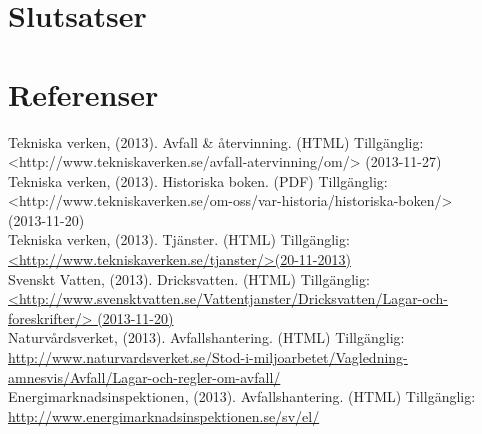 \documentclass[10pt,a4paper]{article}
\begin{document}
\section{Slutsatser}

\newpage
\section{Referenser}
Tekniska verken, (2013). Avfall \& återvinning. (HTML) Tillgänglig: \\
<http://www.tekniskaverken.se/avfall-atervinning/om/> (2013-11-27) \\
\newline
Tekniska verken, (2013). Historiska boken. (PDF) Tillgänglig: \\
<http://www.tekniskaverken.se/om-oss/var-historia/historiska-boken/> \\
(2013-11-20)\\
\newline
Tekniska verken, (2013). Tjänster. (HTML) Tillgänglig: \\
\hyperref{http://www.tekniskaverken.se/tjanster/}{}{}{<http://www.tekniskaverken.se/tjanster/>(20-11-2013)}\\
\newline
Svenskt Vatten, (2013). Dricksvatten. (HTML) Tillgänglig: \\
\hyperref{http://www.svensktvatten.se/Vattentjanster/Dricksvatten/Lagar-och-foreskrifter/}{}{}{<http://www.svensktvatten.se/Vattentjanster/Dricksvatten/Lagar-och-foreskrifter/>
(2013-11-20)} \\
\newline
Naturvårdsverket, (2013). Avfallshantering. (HTML) Tillgänglig: \\
\hyperref{http://www.naturvardsverket.se/Stod-i-miljoarbetet/Vagledning-amnesvis/Avfall/Lagar-och-regler-om-avfall/}{}{}{http://www.naturvardsverket.se/Stod-i-miljoarbetet/Vagledning-amnesvis/Avfall/Lagar-och-regler-om-avfall/}\\
\newline
Energimarknadsinspektionen, (2013). Avfallshantering. (HTML) Tillgänglig: \\
\hyperref{http://www.energimarknadsinspektionen.se/sv/el/}{}{}{http://www.energimarknadsinspektionen.se/sv/el/}\\
\end{document}

